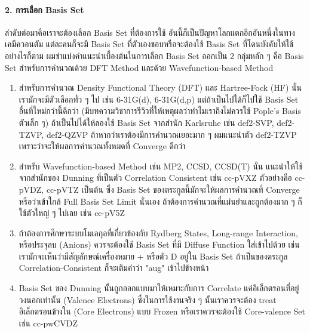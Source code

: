 \paragraph{2. การเลือก Basis Set}
ลำดับต่อมาคือเราจะต้องเลือก Basis Set ที่ต้องการใช้ อันนี้ก็เป็นปัญหาโลกแตกอีกอันหนึ่งในทางเคมีควอนตัม แต่ละคนก็จะมี Basis Set
ที่ตัวเองชอบหรือจะต้องใช้ Basis Set ที่โดนบังคับให้ใช้ อย่างไรก็ตาม ผมขำแบ่งคำแนะนำเบื้องต้นในการเลือก Basis Set ออกเป็น 2 กลุ่มหลัก ๆ
คือ Basis Set สำหรับการคำนวณด้วย DFT Method และด้วย Wavefunction-based Method

\begin{enumerate}
  \item สำหรับการคำนวณ Density Functional Theory (DFT) และ Hartree-Fock (HF) นั้นเรามักจะมีตัวเลือกทั่ว ๆ ไป เช่น
        6-31G(d), 6-31G(d,p) แต่ถ้าเป็นไปได้ก็ไปใช้ Basis Set อื่นที่ใหม่กว่านี้ดีกว่า (มีบทความวิชาการรีวิวที่ให้เหตุผลว่าทำไมเราถึงไม่ควรใช้
        Pople's Basis ตัวเล็ก ๆ) ถ้าเป็นไปได้ให้ลองใช้ Basis Set จากสำนัก Karlsruhe เช่น def2-SVP, def2-TZVP, def2-QZVP
        ถ้าหากว่าเราต้องมีการคำนวณเยอะมาก ๆ ผมแนะนำตัว def2-TZVP เพราะว่าจะให้ผลการคำนวณทั้งหมดที่ Converge ดีกว่า

  \item สำหรับ Wavefunction-based Method เช่น MP2, CCSD, CCSD(T) นั่น แนะนำให้ใช้จากสำนักของ Dunning ที่เป็นตัว
        Correlation Consistent เช่น cc-pVXZ ตัวอย่างคือ cc-pVDZ, cc-pVTZ เป็นต้น ซึ่ง Basis Set ของตระกูลนี้มักจะให้ผลการคำนวณที่
        Converge หรือว่าเข้าใกล้ Full Basis Set Limit นั่นเอง ถ้าต้องการคำนวณที่แม่นยำและถูกต้องมาก ๆ ก็ใช้ตัวใหญ่ ๆ ไปเลย
        เช่น cc-pV5Z

  \item ถ้าต้องการศึกษาระบบโมเลกุลที่เกี่ยวข้องกับ Rydberg States, Long-range Interaction, หรือประจุลบ (Anions)
        ควรจะต้องใช้ Basis Set ที่มี Diffuse Function ใส่เข้าไปด้วย เช่น เรามักจะเห็นว่ามีสัญลักษณ์เครื่องหมาย + หรือตัว D อยู่ใน
        Basis Set ถ้าเป็นของตระกูล Correlation-Consistent ก็จะเติมคำว่า "aug" เข้าไปข้างหน้า

  \item Basis Set ของ Dunning นั้นถูกออกแบบมาให้เหมาะกับการ Correlate แค่อิเล็กตรอนที่อยู่วงนอกเท่านั้น (Valence Electrons)
        ซึ่งในการใช้งานจริง ๆ นั้นเราควรจะต้อง treat อิเล็กตรอนข้างใน (Core Electrons) แบบ Frozen หรือเราควรจะต้องใช้
        Core-valence Set เช่น cc-pwCVDZ
\end{enumerate}

